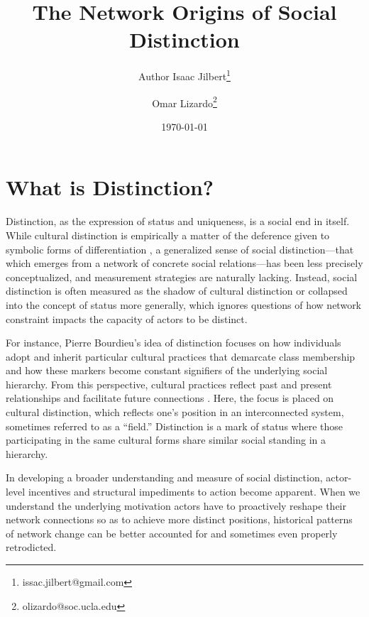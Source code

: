 \documentclass[12pt]{article}
\begin{document}
\title{The Network Origins of Social Distinction}
\author[1]{Author Isaac Jilbert\thanks{issac.jilbert@gmail.com}}
\author[1]{Omar Lizardo\thanks{olizardo@soc.ucla.edu}}

\renewcommand\Authands{ and }

\date{\normalsize \today}	
\maketitle

\newpage
\begin{abstract}	
\end{abstract}

\newpage
\section{What is Distinction?}

Distinction, as the expression of status and uniqueness, is a social end in itself. While cultural distinction is empirically a matter of the deference given to symbolic forms of differentiation \citep{bourdieu84}, a generalized sense of social distinction---that which emerges from a network of concrete social relations---has been less precisely conceptualized, and measurement strategies are naturally lacking. Instead, social distinction is often measured as the shadow of cultural distinction or collapsed into the concept of status more generally, which ignores questions of how network constraint impacts the capacity of actors to be distinct. 

For instance, Pierre Bourdieu’s idea of distinction focuses on how individuals adopt and inherit particular cultural practices that demarcate class membership and how these markers become constant signifiers of the underlying social hierarchy. From this perspective, cultural practices reflect past and present relationships and facilitate future connections \citep{bourdieu84}. Here, the focus is placed on cultural distinction, which reflects one’s position in an interconnected system, sometimes referred to as a ``field.'' Distinction is a mark of status where those participating in the same cultural forms share similar social standing in a hierarchy. 

In developing a broader understanding and measure of social distinction,  actor-level incentives and structural impediments to action become apparent. When we understand the underlying motivation actors have to proactively reshape their network connections so as to achieve more distinct positions, historical patterns of network change can be better accounted for and sometimes even properly retrodicted. 
\end{document}
